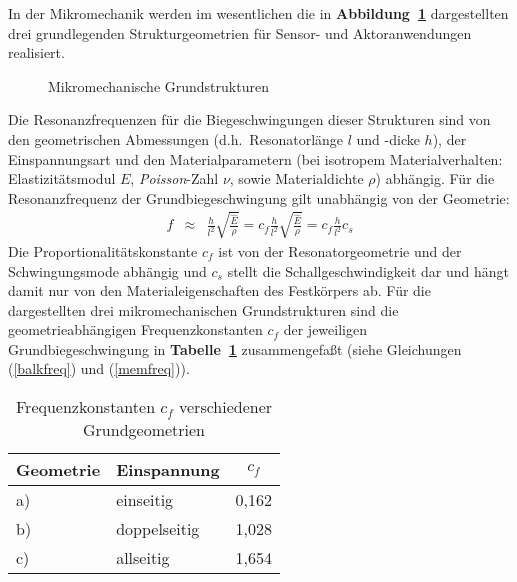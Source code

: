 In der Mikromechanik werden im wesentlichen die in
{\bf Abbildung~\ref{abbgrundgeometrien}}
dargestellten drei grundlegenden Strukturgeometrien für Sensor- und
Aktoranwendungen realisiert.
\begin{figure}[htb]
\begin{center}

\setabbzs
\end{center}
\caption{\label{abbgrundgeometrien}
 Mikromechanische Grundstrukturen}
\end{figure}
Die Resonanzfrequenzen für die
Biegeschwingungen dieser Strukturen sind von den geometrischen
Abmessungen (d.h.\ Resonatorlänge $l$ und -dicke $h$), der Einspannungsart
und den Materialparametern (bei isotropem Materialverhalten:
Elastizitätsmodul $E$, {\sl Poisson}-Zahl $ \nu $, sowie Materialdichte
$\rho$) abhängig. Für die Resonanzfrequenz der Grundbiegeschwingung
gilt unabhängig von der Geometrie:
%
\begin{eqnarray}
\label{freqskal}
      f & \approx & \frac{h}{l^{2}} \sqrt{ \frac{\hat E}{ \rho}}
         = c_{f} \frac{h}{l^{2}} \sqrt{ \frac{\hat E}{ \rho}}
         = c_{f} \frac{h}{l^{2}} c_{s}
\end{eqnarray}
%
Die Proportionalitätskonstante $c_{f}$ ist von der Resonatorgeometrie
und der Schwingungsmode abhängig und $c_{s}$ stellt die Schallgeschwindigkeit
dar und hängt damit nur von den Materialeigenschaften des Festkörpers ab.
Für die dargestellten drei
mikromechanischen Grundstrukturen sind die geometrieabhängigen
Frequenzkonstanten $c_{f}$ der jeweiligen Grundbiegeschwingung
in {\bf Tabelle~\ref{tabcf}} zusammengefaßt
(siehe Gleichungen (\ref{balkfreq})
und (\ref{memfreq})).
\begin{table}[htb]
\caption{\label{tabcf}
 Frequenzkonstanten $c_{f}$ verschiedener Grundgeometrien}
\begin{center}
\begin{tabular} {|l|l||c|}
\hline
 Geometrie  &  Einspannung      &  $c_{f}$ \\
\hline \hline
 a)  &  einseitig     & 0,162 \\
 b)  &  doppelseitig  & 1,028 \\
 c)  &  allseitig     & 1,654 \\
\hline
\end{tabular}
\end{center}
\end{table}
